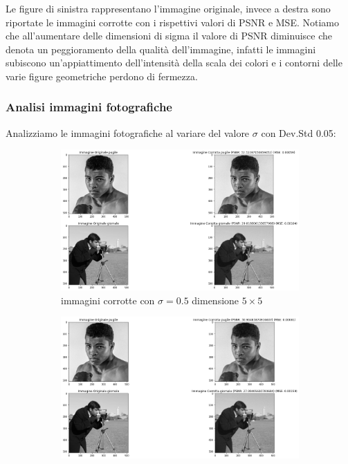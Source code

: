 Le figure di sinistra rappresentano l'immagine originale, invece a destra sono riportate le immagini corrotte 
con i rispettivi valori di PSNR e MSE. 
Notiamo che all'aumentare delle dimensioni di sigma il valore di PSNR diminuisce che denota un peggioramento 
della qualità dell'immagine, infatti le immagini subiscono un'appiattimento dell'intensità della scala dei 
colori e i contorni delle varie figure geometriche perdono di fermezza. 

\subsubsection{Analisi immagini fotografiche}
Analizziamo le immagini fotografiche al variare del valore $\sigma$ con Dev.Std 0.05:
\begin{figure}[H]
    \centering
    \begin{subfigure}{0.67\textwidth}
        \centering
        \includegraphics[width=\textwidth]{confrontiPuntoUno/5-0.5-0.02.png}
        \caption{immagini corrotte con $\sigma = 0.5$ dimensione $5 \times 5$}
        \label{fig:fotogrCorrotte5x5}
    \end{subfigure}
    \begin{subfigure}{0.67\textwidth}
        \centering
        \includegraphics[width=\textwidth]{confrontiPuntoUno/7-1-0.02.png}

\end{subfigure}
\end{figure}
